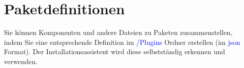 \documentclass[10pt,a4paper,final,parskip]{scrartcl}
\title
{}
\author 
{}
\date{\vspace{12cm}\monthword{\the\month}\space\the\year}
\subtitle
{}
\numberwithin{equation}{section}
\newcommand{\blau}[1]{\textcolor{blue}{#1}}
\begin{document}


\section{Paketdefinitionen}
Sie können Komponenten und andere Dateien zu Paketen zusammenstellen, indem Sie eine entsprechende Definition im \blau{/Plugins} Ordner erstellen (im \blau{json} Format). Der Installationsassistent wird diese selbstständig erkennen und verwenden.
\end{document}
